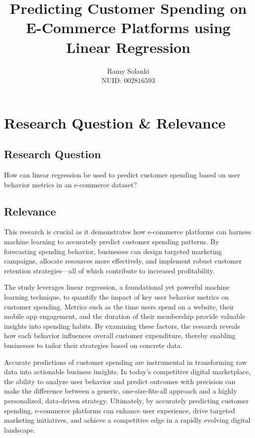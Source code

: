 \documentclass[12pt]{article}
\title{Predicting Customer Spending on E-Commerce Platforms using Linear Regression}
\author{Ramy Solanki \\ NUID: 002816593}
\date{}
\begin{document}
\maketitle

\section{Research Question \& Relevance}
\subsection*{Research Question}
How can linear regression be used to predict customer spending based on user behavior metrics in an e-commerce dataset?

\subsection*{Relevance}
This research is crucial as it demonstrates how e-commerce platforms can harness machine learning to accurately predict customer spending patterns. By forecasting spending behavior, businesses can design targeted marketing campaigns, allocate resources more effectively, and implement robust customer retention strategies---all of which contribute to increased profitability.

The study leverages linear regression, a foundational yet powerful machine learning technique, to quantify the impact of key user behavior metrics on customer spending. Metrics such as the time users spend on a website, their mobile app engagement, and the duration of their membership provide valuable insights into spending habits. By examining these factors, the research reveals how each behavior influences overall customer expenditure, thereby enabling businesses to tailor their strategies based on concrete data.

Accurate predictions of customer spending are instrumental in transforming raw data into actionable business insights. In today’s competitive digital marketplace, the ability to analyze user behavior and predict outcomes with precision can make the difference between a generic, one-size-fits-all approach and a highly personalized, data-driven strategy. Ultimately, by accurately predicting customer spending, e-commerce platforms can enhance user experience, drive targeted marketing initiatives, and achieve a competitive edge in a rapidly evolving digital landscape.
\end{document}
